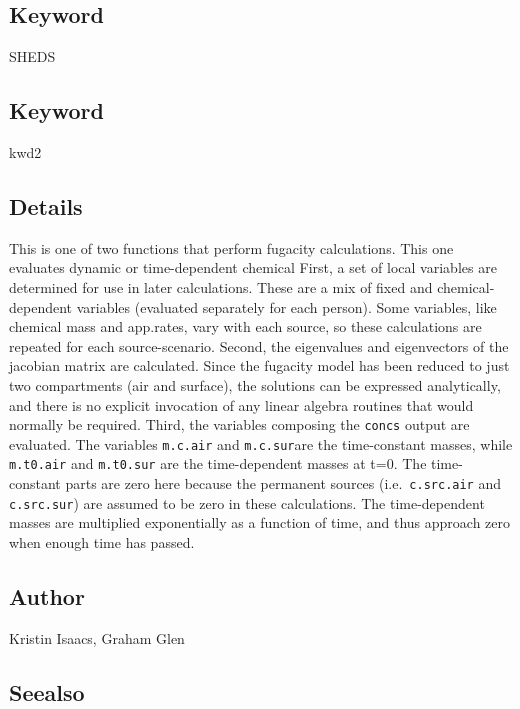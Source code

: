\documentclass[
]{article}
\begin{document}
\hypertarget{keyword-2}{%
\subsection{Keyword}\label{keyword-2}}

SHEDS

\hypertarget{keyword-3}{%
\subsection{Keyword}\label{keyword-3}}

kwd2

\hypertarget{details-17}{%
\subsection{Details}\label{details-17}}

This is one of two functions that perform fugacity calculations. This
one evaluates dynamic or time-dependent chemical First, a set of local
variables are determined for use in later calculations. These are a mix
of fixed and chemical-dependent variables (evaluated separately for each
person). Some variables, like chemical mass and app.rates, vary with
each source, so these calculations are repeated for each
source-scenario. Second, the eigenvalues and eigenvectors of the
jacobian matrix are calculated. Since the fugacity model has been
reduced to just two compartments (air and surface), the solutions can be
expressed analytically, and there is no explicit invocation of any
linear algebra routines that would normally be required. Third, the
variables composing the \texttt{concs} output are evaluated. The
variables \texttt{m.c.air} and \texttt{m.c.sur}are the time-constant
masses, while \texttt{m.t0.air} and \texttt{m.t0.sur} are the
time-dependent masses at t=0. The time-constant parts are zero here
because the permanent sources (i.e.~\texttt{c.src.air} and
\texttt{c.src.sur}) are assumed to be zero in these calculations. The
time-dependent masses are multiplied exponentially as a function of
time, and thus approach zero when enough time has passed.

\hypertarget{author-19}{%
\subsection{Author}\label{author-19}}

Kristin Isaacs, Graham Glen

\hypertarget{seealso-15}{%
\subsection{Seealso}\label{seealso-15}}
\end{document}
